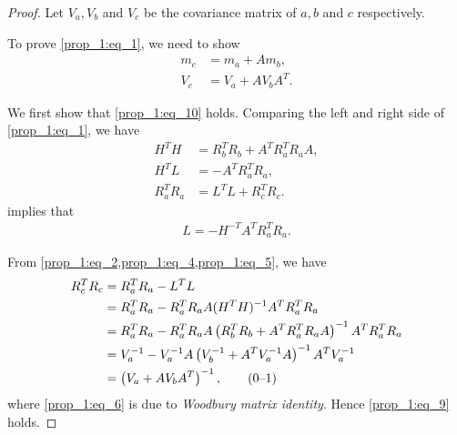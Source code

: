 \documentclass[microtype]{gtpart}     %
\theoremstyle{definition}
\newcommand\numberthis{\addtocounter{equation}{1}\tag{\theequation}}
\begin{document}
\begin{proof}
	Let $V_a, V_b$ and $V_c$ be the covariance matrix of $a, b$ and $c$ respectively.
	
	To prove \cref{prop_1:eq_1}, we need to show
	\begin{align}
		m_c &= m_a + A m_b, \label{prop_1:eq_9}\\
		V_c &= V_a + A V_b A^T. \label{prop_1:eq_10}
	\end{align}
	
	We first show that \cref{prop_1:eq_10} holds.
	Comparing the left and right side of \cref{prop_1:eq_1}, we have
	\begin{align}
		H^TH &= R^T_b R_b + A^T R^T_a R_a A, \label{prop_1:eq_2}\\
		H^TL &= -A^T R^T_a R_a, \label{prop_1:eq_3}\\
		R^T_a R_a &= L^T L + R^T_c R_c. \label{prop_1:eq_4}
	\end{align}
	 implies that
	\begin{align}
		L = - H^{-T} A^T R^T_a R_a. \label{prop_1:eq_5}
	\end{align}
	
	From \cref{prop_1:eq_2,prop_1:eq_4,prop_1:eq_5}, we have
	\begin{align*}
		R^T_c R_c 	&= R^T_a R_a - L^T L \\
					&= R^T_a R_a - R^T_a R_a A (H^TH)^{-1} A^T R^T_a R_a \\
					&= R^T_a R_a - R^T_a R_a A \left( R^T_b R_b + A^T R^T_a R_a A \right)^{-1} A^T R^T_a R_a \\
					&= V_a^{-1} - V_a^{-1} A \left( V_b^{-1} + A^T V_a^{-1} A \right)^{-1} A^T V_a^{-1} \\
					&= \left( V_a + A V_b A^T \right)^{-1}, \numberthis\label{prop_1:eq_6}
	\end{align*}
	where \cref{prop_1:eq_6} is due to \textit{Woodbury matrix identity}.
	Hence \cref{prop_1:eq_9} holds.
	

\end{proof}
\end{document}
